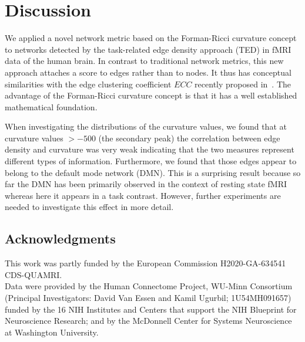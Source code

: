 \documentclass[english,11pt]{article}
\begin{document}
\section{Discussion}

We applied a novel network metric based on the Forman-Ricci curvature concept to networks detected
by the task-related edge density approach (TED) in fMRI data of the human brain.
In contrast to traditional network metrics, this new approach attaches a score to edges rather
than to nodes. It thus has conceptual similarities with the edge clustering coefficient $ECC$
recently proposed in~\cite{Wang2012}. The advantage of the Forman-Ricci curvature concept
is that it has a well established mathematical foundation.

When investigating the distributions of the curvature values, we found that
at curvature values $> -500$ (the secondary peak) the correlation
between edge density and curvature was very weak indicating that the two measures represent different types of
information. Furthermore, we found that those edges appear to
belong to the default mode network (DMN). This is a surprising result
because so far the DMN has been primarily observed in the context of resting state fMRI
whereas here it appears in a task contrast.
However, further experiments are needed to investigate this effect in more detail.


\bigskip


\subsection*{Acknowledgments}
This work was partly funded by the European Commission H2020-GA-634541 CDS-QUAMRI.\\
Data were provided by the Human Connectome Project, WU-Minn Consortium (Principal Investigators:
David Van Essen and Kamil Ugurbil; 1U54MH091657)
funded by the 16 NIH  Institutes and Centers that support the NIH Blueprint for Neuroscience Research;
and by the McDonnell Center for Systems Neuroscience at Washington University.





\end{document}
